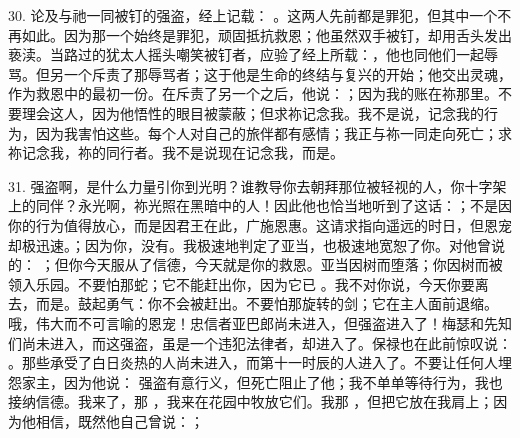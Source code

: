 30. 论及与祂一同被钉的强盗，经上记载： 。这两人先前都是罪犯，但其中一个不再如此。因为那一个始终是罪犯，顽固抵抗救恩；他虽然双手被钉，却用舌头发出亵渎。当路过的犹太人摇头嘲笑被钉者，应验了经上所载：，他也同他们一起辱骂。但另一个斥责了那辱骂者；这于他是生命的终结与复兴的开始；他交出灵魂，作为救恩中的最初一份。在斥责了另一个之后，他说：；因为我的账在祢那里。不要理会这人，因为他悟性的眼目被蒙蔽；但求祢记念我。我不是说，记念我的行为，因为我害怕这些。每个人对自己的旅伴都有感情；我正与祢一同走向死亡；求祢记念我，祢的同行者。我不是说现在记念我，而是。\par

31. 强盗啊，是什么力量引你到光明？谁教导你去朝拜那位被轻视的人，你十字架上的同伴？永光啊，祢光照在黑暗中的人！因此他也恰当地听到了这话：；不是因你的行为值得放心，而是因君王在此，广施恩惠。这请求指向遥远的时日，但恩宠却极迅速。；因为你，没有。我极速地判定了亚当，也极速地宽恕了你。对他曾说的： ；但你今天服从了信德，今天就是你的救恩。亚当因树而堕落；你因树而被领入乐园。不要怕那蛇；它不能赶出你，因为它已 。我不对你说，今天你要离去，而是。鼓起勇气：你不会被赶出。不要怕那旋转的剑；它在主人面前退缩。哦，伟大而不可言喻的恩宠！忠信者亚巴郎尚未进入，但强盗进入了！梅瑟和先知们尚未进入，而这强盗，虽是一个违犯法律者，却进入了。保禄也在此前惊叹说： 。那些承受了白日炎热的人尚未进入，而第十一时辰的人进入了。不要让任何人埋怨家主，因为他说： 强盗有意行义，但死亡阻止了他；我不单单等待行为，我也接纳信德。我来了，那 ，我来在花园中牧放它们。我那 ，但把它放在我肩上；因为他相信，既然他自己曾说：；\par

